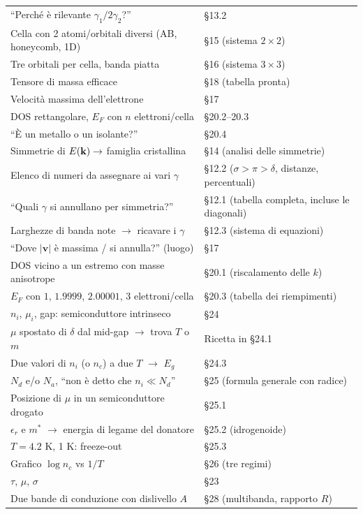 \begin{center}
{\begin{tabular}{p{7.4cm} p{9.6cm}}
``Perché è rilevante $\gamma_1/2\gamma_2$?'' & §13.2  \\
Cella con 2 atomi/orbitali diversi (AB, honeycomb, 1D) & §15 (sistema $2\times2$)  \\
Tre orbitali per cella, banda piatta & §16 (sistema $3\times3$)  \\
Tensore di massa efficace & §18 (tabella pronta)  \\
Velocità massima dell'elettrone & §17  \\
DOS rettangolare, $E_F$ con $n$ elettroni/cella & §20.2--20.3  \\
``È un metallo o un isolante?'' & §20.4  \\
Simmetrie di $E(\mathbf{k})\to$ famiglia cristallina & §14 (analisi delle simmetrie)  \\
Elenco di numeri da assegnare ai vari $\gamma$ & §12.2 ($\sigma>\pi>\delta$, distanze, percentuali)  \\
``Quali $\gamma$ si annullano per simmetria?'' & §12.1 (tabella completa, incluse le diagonali)  \\
Larghezze di banda note $\to$ ricavare i $\gamma$ & §12.3 (sistema di equazioni)  \\
``Dove $|\mathbf{v}|$ è massima / si annulla?'' (luogo) & §17  \\
DOS vicino a un estremo con masse anisotrope & §20.1 (riscalamento delle $k$)  \\
$E_F$ con $1$, $1.9999$, $2.00001$, $3$ elettroni/cella & §20.3 (tabella dei riempimenti)  \\
\midrule
$n_i$, $\mu_i$, gap: semiconduttore intrinseco & §24  \\
$\mu$ spostato di $\delta$ dal mid-gap $\to$ trova $T$ o $m$ & Ricetta in §24.1  \\
Due valori di $n_i$ (o $n_c$) a due $T$ $\to$ $E_g$ & §24.3  \\
$N_d$ e/o $N_a$, ``non è detto che $n_i\ll N_d$'' & §25 (formula generale con radice)  \\
Posizione di $\mu$ in un semiconduttore drogato & §25.1  \\
$\epsilon_r$ e $m^*$ $\to$ energia di legame del donatore & §25.2 (idrogenoide)  \\
$T=4.2$ K, 1 K: freeze-out & §25.3  \\
Grafico $\log n_c$ vs $1/T$ & §26 (tre regimi)  \\
$\tau$, $\mu$, $\sigma$ & §23  \\
Due bande di conduzione con dislivello $A$ & §28 (multibanda, rapporto $R$)  \\
\bottomrule
\end{tabular}}
\end{center}

